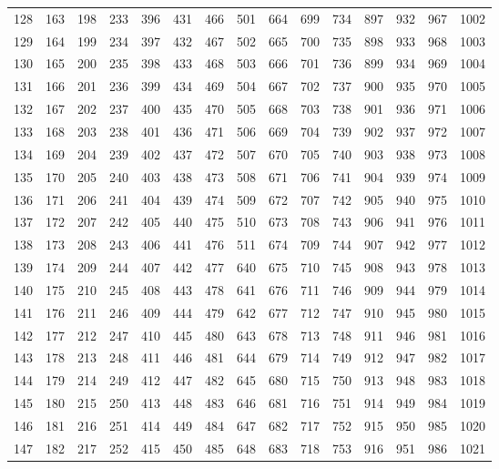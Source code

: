 \documentclass{assignment}
\begin{document}
\begin{tabular}{r r r r r r r r r r r r r r r}
128 & 163 & 198 & 233 & 396 & 431 & 466 & 501 & 664 & 699 & 734 & 897 & 932 & 967 & 1002 \\
129 & 164 & 199 & 234 & 397 & 432 & 467 & 502 & 665 & 700 & 735 & 898 & 933 & 968 & 1003 \\
130 & 165 & 200 & 235 & 398 & 433 & 468 & 503 & 666 & 701 & 736 & 899 & 934 & 969 & 1004 \\
131 & 166 & 201 & 236 & 399 & 434 & 469 & 504 & 667 & 702 & 737 & 900 & 935 & 970 & 1005 \\
132 & 167 & 202 & 237 & 400 & 435 & 470 & 505 & 668 & 703 & 738 & 901 & 936 & 971 & 1006 \\
133 & 168 & 203 & 238 & 401 & 436 & 471 & 506 & 669 & 704 & 739 & 902 & 937 & 972 & 1007 \\
134 & 169 & 204 & 239 & 402 & 437 & 472 & 507 & 670 & 705 & 740 & 903 & 938 & 973 & 1008 \\
135 & 170 & 205 & 240 & 403 & 438 & 473 & 508 & 671 & 706 & 741 & 904 & 939 & 974 & 1009 \\
136 & 171 & 206 & 241 & 404 & 439 & 474 & 509 & 672 & 707 & 742 & 905 & 940 & 975 & 1010 \\
137 & 172 & 207 & 242 & 405 & 440 & 475 & 510 & 673 & 708 & 743 & 906 & 941 & 976 & 1011 \\
138 & 173 & 208 & 243 & 406 & 441 & 476 & 511 & 674 & 709 & 744 & 907 & 942 & 977 & 1012 \\
139 & 174 & 209 & 244 & 407 & 442 & 477 & 640 & 675 & 710 & 745 & 908 & 943 & 978 & 1013 \\
140 & 175 & 210 & 245 & 408 & 443 & 478 & 641 & 676 & 711 & 746 & 909 & 944 & 979 & 1014 \\
141 & 176 & 211 & 246 & 409 & 444 & 479 & 642 & 677 & 712 & 747 & 910 & 945 & 980 & 1015 \\
142 & 177 & 212 & 247 & 410 & 445 & 480 & 643 & 678 & 713 & 748 & 911 & 946 & 981 & 1016 \\
143 & 178 & 213 & 248 & 411 & 446 & 481 & 644 & 679 & 714 & 749 & 912 & 947 & 982 & 1017 \\
144 & 179 & 214 & 249 & 412 & 447 & 482 & 645 & 680 & 715 & 750 & 913 & 948 & 983 & 1018 \\
145 & 180 & 215 & 250 & 413 & 448 & 483 & 646 & 681 & 716 & 751 & 914 & 949 & 984 & 1019 \\
146 & 181 & 216 & 251 & 414 & 449 & 484 & 647 & 682 & 717 & 752 & 915 & 950 & 985 & 1020 \\
147 & 182 & 217 & 252 & 415 & 450 & 485 & 648 & 683 & 718 & 753 & 916 & 951 & 986 & 1021 \\

\end{tabular}
\end{document}
